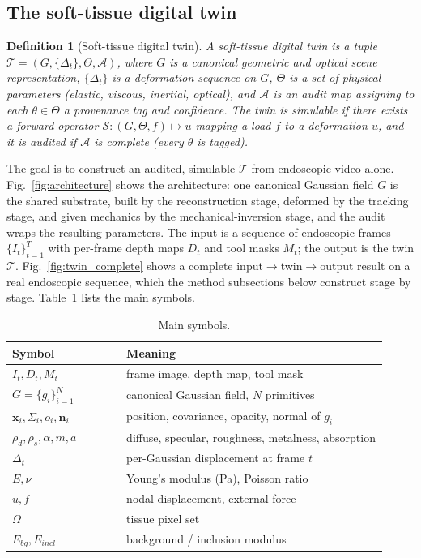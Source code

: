 \documentclass[review]{elsarticle}
\newtheorem{definition}{Definition}
\begin{document}
\subsection{The soft-tissue digital twin}
\label{sec:twin}
\begin{definition}[Soft-tissue digital twin]
\label{def:twin}
A soft-tissue digital twin is a tuple
$\mathcal{T} = (G, \{\Delta_t\}, \Theta, \mathcal{A})$, where $G$ is a
canonical geometric and optical scene representation, $\{\Delta_t\}$ is a
deformation sequence on $G$, $\Theta$ is a set of physical parameters
(elastic, viscous, inertial, optical), and $\mathcal{A}$ is an audit map
assigning to each $\theta \in \Theta$ a provenance tag and confidence. The
twin is \emph{simulable} if there exists a forward operator
$\mathcal{S} : (G, \Theta, f) \mapsto u$ mapping a load $f$ to a
deformation $u$, and it is \emph{audited} if $\mathcal{A}$ is complete
(every $\theta$ is tagged).
\end{definition}

The goal is to construct an audited, simulable $\mathcal{T}$ from
endoscopic video alone. Fig.~\ref{fig:architecture} shows the architecture:
one canonical Gaussian field $G$ is the shared substrate, built by the reconstruction stage,
deformed by the tracking stage, and given mechanics by the mechanical-inversion stage, and the audit wraps the
resulting parameters. The input is a sequence of endoscopic frames
$\{I_t\}_{t=1}^{T}$ with per-frame depth maps $D_t$ and tool masks $M_t$;
the output is the twin $\mathcal{T}$.
Fig.~\ref{fig:twin_complete} shows a complete input$\to$twin$\to$output
result on a real endoscopic sequence, which the method subsections below
construct stage by stage. Table~\ref{tab:notation} lists the
main symbols.

\begin{table}[htbp]
\centering
\caption{Main symbols.}
\label{tab:notation}
\small
\begin{tabular}{@{}p{0.28\linewidth}p{0.64\linewidth}@{}}
\toprule
Symbol & Meaning \\
\midrule
$I_t, D_t, M_t$ & frame image, depth map, tool mask \\
$G=\{g_i\}_{i=1}^{N}$ & canonical Gaussian field, $N$ primitives \\
$\mathbf{x}_i, \Sigma_i, o_i, \mathbf{n}_i$ & position, covariance, opacity, normal of $g_i$ \\
$\rho_d,\rho_s,\alpha,m,a$ & diffuse, specular, roughness, metalness, absorption \\
$\Delta_t$ & per-Gaussian displacement at frame $t$ \\
$E, \nu$ & Young's modulus (Pa), Poisson ratio \\
$u, f$ & nodal displacement, external force \\
$\Omega$ & tissue pixel set \\
$E_{bg}, E_{incl}$ & background / inclusion modulus \\
\bottomrule
\end{tabular}
\end{table}
\end{document}
